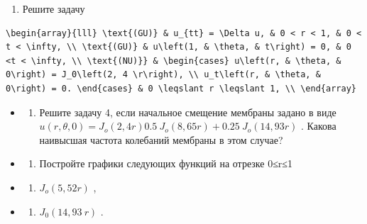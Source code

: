 \documentclass[
  ukrainian,
]{article}
\providecommand{\tightlist}{%
  \setlength{\itemsep}{0pt}\setlength{\parskip}{0pt}}
\begin{document}
\begin{enumerate}
\def\labelenumi{\arabic{enumi}.}
\setcounter{enumi}{3}
\tightlist
\item
  Решите задачу
\end{enumerate}

\begin{verbatim}
\begin{array}{lll} \text{(GU)} & u_{tt} = \Delta u, & 0 < r < 1, & 0 < t < \infty, \\ \text{(GU)} & u\left(1, & \theta, & t\right) = 0, & 0 <t < \infty, \\ \text{(NU)}} & \begin{cases} u\left(r, & \theta, & 0\right) = J_0\left(2, 4 \r\right), \\ u_t\left(r, & \theta, & 0\right) = 0. \end{cases} & 0 \leqslant r \leqslant 1, \\ \end{array}
\end{verbatim}

\begin{itemize}
\tightlist
\item
  \begin{enumerate}
  \def\labelenumi{\arabic{enumi}.}
  \setcounter{enumi}{4}
  \tightlist
  \item
    Решите задачу 4, если начальное смещение мембраны задано в виде
    \(u(r, \theta, 0) = J_{\mathrm{ }o}(2,4r) 0.5\ J_{\mathrm{ }o}(8,65r) + 0.25\ J_{\mathrm{ }o}(14,93r)\)
    . Какова наивысшая частота колебаний мембраны в этом случае?
  \end{enumerate}
\item
  \begin{enumerate}
  \def\labelenumi{\arabic{enumi}.}
  \setcounter{enumi}{5}
  \tightlist
  \item
    Постройте графики следующих функций на отрезке 0≤r≤1
  \end{enumerate}
\item
  \begin{enumerate}
  \def\labelenumi{\alph{enumi})}
  \tightlist
  \item
    \(J_{o}(5,52 r)\) ,
  \end{enumerate}
\item
  \begin{enumerate}
  \def\labelenumi{\arabic{enumi})}
  \setcounter{enumi}{5}
  \tightlist
  \item
    \(J_0(14,93 \ r)\) .
  \end{enumerate}
\end{itemize}
\end{document}
